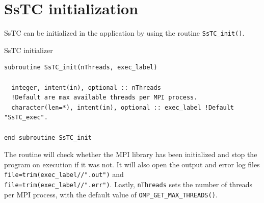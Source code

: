 \documentclass[10pt,a4paper]{article}
\begin{document}
\section{SsTC initialization}
SsTC can be initialized in the application by using the routine \verb|SsTC_init()|.
\begin{codebox}{SsTC initializer}
\begin{lstlisting}[caption={Interface of ``SsTC initialization".},captionpos=b]
subroutine SsTC_init(nThreads, exec_label)

  integer, intent(in), optional :: nThreads
  !Default are max available threads per MPI process.
  character(len=*), intent(in), optional :: exec_label !Default "SsTC_exec".

end subroutine SsTC_init
\end{lstlisting}
\end{codebox}
The routine will check whether the MPI library has been initialized and stop the program on execution if it was not. It will also open the output and error log files \verb|file=trim(exec_label//".out")| and \\ \verb|file=trim(exec_label//".err")|. Lastly, \verb|nThreads| sets the number of threads per MPI process, with the default value of \verb|OMP_GET_MAX_THREADS()|.
\end{document}
